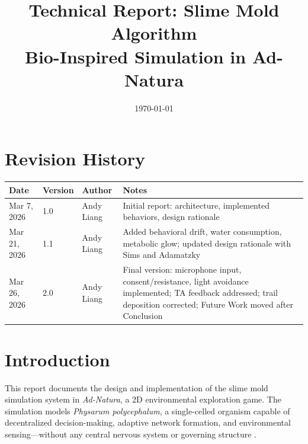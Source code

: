 \documentclass[12pt, titlepage]{article}
\begin{document}
\title{Technical Report: Slime Mold Algorithm\\Bio-Inspired Simulation in Ad-Natura\\[0.5em]
\large \progname}
\author{\authname}
\date{\today}

\maketitle


\newpage

\tableofcontents

\newpage

\section{Revision History}

\begin{tabularx}{\textwidth}{p{3cm}p{2cm}p{2.5cm}X}
\toprule {\bf Date} & {\bf Version} & {\bf Author} & {\bf Notes}\\
\midrule
Mar 7, 2026 & 1.0 & Andy Liang & Initial report: architecture, implemented behaviors, design rationale\\
Mar 21, 2026 & 1.1 & Andy Liang & Added behavioral drift, water consumption, metabolic glow; updated design rationale with Sims and Adamatzky\\
Mar 26, 2026 & 2.0 & Andy Liang & Final version: microphone input, consent/resistance, light avoidance implemented; TA feedback addressed; trail deposition corrected; Future Work moved after Conclusion\\
\bottomrule
\end{tabularx}

\newpage


\section{Introduction}
\label{sec:intro}

This report documents the design and implementation of the slime mold
simulation system in \textit{Ad-Natura}, a 2D environmental exploration game.
The simulation models \textit{Physarum polycephalum}, a single-celled organism
capable of decentralized decision-making, adaptive network formation, and
environmental sensing---without any central nervous system or governing
structure \cite{keller1983, adamatzky2014}.
\end{document}

